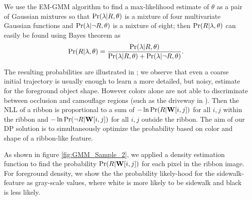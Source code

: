 
We use the EM-GMM algorithm to find a max-likelihood estimate of $\theta$ as a pair of Gaussian mixtures so that $\Pr(\lambda{}|R, \theta)$ is a mixture of four multivariate Gaussian functions and $\Pr(\lambda{}|\neg R, \theta)$ is a mixture of eight; then $\Pr(R|\lambda{}, \theta)$ can easily be found using Bayes theorem as 
$$\Pr(R|\lambda{}, \theta)= \frac{\Pr(\lambda{}|R, \theta)}{\Pr(\lambda{}|R, \theta)+\Pr(\lambda{}|\neg R, \theta)}.$$




The resulting probabilities are illustrated in ; we observe that even a
coarse initial trajectory is usually enough to learn a more detailed, but noisy, estimate for the
foreground object shape. However colors alone are not able to discriminate between occlusion and
camouflage regions (such as the driveway in ).
Then the \ac{NLL} of a ribbon is proportional to a sum of $-\ln \Pr(R|\mathbf{W}{}[i,j])$
for all $i,j$ within the ribbon and $-\ln \Pr(\neg R| \mathbf{W}{}[i,j])$ for all $i,j$ outside the ribbon.
 The aim of our
\ac{DP} solution is to simultaneously optimize the probability based on color and shape of a
ribbon-like feature.

As shown in figure \ref{fig:GMM_Sample_2}, we applied a density estimation function to find the probability 
$\Pr(R|\mathbf{W}[i,j])$ for each pixel in the ribbon image. 
For foreground density, we show the the probability likely-hood for 
the sidewalk-feature as gray-scale values, where white is more likely to be sidewalk and black is less likely. 

